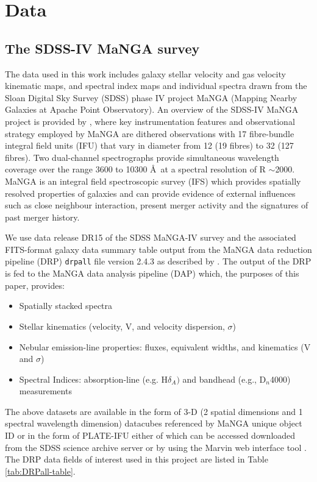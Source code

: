 \section{Data}
\label{sec:data}

\subsection{The SDSS-IV MaNGA survey}
\label{sec:MaNGA}
The data used in this work includes galaxy stellar velocity and gas velocity kinematic maps, and spectral index maps and individual spectra drawn from the Sloan Digital Sky Survey (SDSS) phase IV project MaNGA (Mapping Nearby Galaxies at Apache Point Observatory). An overview of the SDSS-IV MaNGA project is provided by \citet{2015ApJ...798....7B}, where key instrumentation features and observational strategy employed by MaNGA are dithered observations with 17 fibre-bundle integral
field units (IFU) that vary in diameter from 12 (19 fibres) to 32 (127 fibres). Two dual-channel spectrographs provide
simultaneous wavelength coverage over the range 3600 to 10300 \AA\ at a spectral resolution of R $\sim$2000. MaNGA is an integral field spectroscopic survey (IFS) which provides spatially resolved properties of galaxies and can provide evidence of external influences such as close neighbour interaction, present merger activity and the signatures of past merger history. 

We use data release DR15 of the SDSS MaNGA-IV survey \citep{2019ApJS..240...23A} and the associated FITS-format galaxy data summary table output from the MaNGA data reduction pipeline (DRP) \texttt{drpall} file version 2.4.3 as described by \citet{2016AJ....152...83L}. The output of the DRP is fed to the MaNGA data analysis pipeline (DAP) which,  the purposes of this paper, provides:
\begin{itemize}
    \item Spatially stacked spectra
    \item Stellar kinematics (velocity, V, and velocity dispersion, $\sigma$)
    \item Nebular emission-line properties: fluxes, equivalent widths, and kinematics (V and $\sigma$)
    \item Spectral Indices: absorption-line (e.g.  H$\delta_A)$ and bandhead (e.g., D$_n$4000) measurements
\end{itemize}

The above datasets are available in the form of 3-D (2 spatial dimensions and 1 spectral wavelength dimension) datacubes referenced by MaNGA unique object ID or in the form of PLATE-IFU either of which can be accessed downloaded from the SDSS science archive server or by using the Marvin web interface tool \citep{2018arXiv181203833C}. The DRP data fields of interest used in this project are listed in Table \ref{tab:DRPall-table}.

